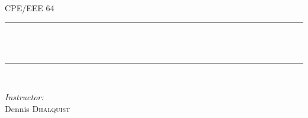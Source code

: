 \begin{titlepage}
	\begin{center}
		\vspace{1 cm}
		
		\textsc{\Huge CPE/EEE 64}\\[1.3cm]

		\vspace{5 mm}
		
		\rule{415pt}{2pt}\\
		{ \huge \bfseries \TITLE \\[0.2cm] }
		\rule{415pt}{2pt}\\
		
		\vspace{10mm}
		
		\begin{minipage}{0.4\textwidth}
		\begin{flushleft} \large
		
		\end{flushleft}
		\end{minipage}
		
		\begin{minipage}{\textwidth}
		\begin{flushright} \large
		
		\centering
		\emph{Instructor:} \\
			Dennis 	\textsc{Dhalquist} \\
		\end{flushright}
		\end{minipage}
	\end{center}
	
	\vspace{30mm}
	
	\begin{center}
	\begin{minipage}{.85\textwidth}
		\begin{flushleft} \large
			\begin{abstract}
				\ABSTRACT \\
			\end{abstract}
		\end{flushleft}
		
		\begin{flushleft} \large
			\begin{keywords}
				\KEYWORDS \\
			\end{keywords}
		\end{flushleft}


\end{minipage}
\end{center}
\end{titlepage}
